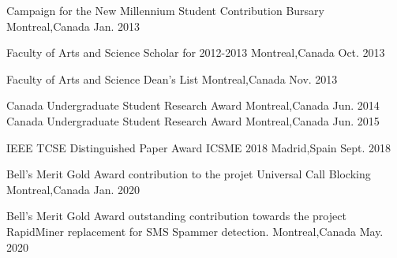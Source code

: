 \documentclass[11pt, a4paper]{awesome-cv} %
\begin{document}


\begin{cvhonors}	%
	
	\cvhonor
	{Campaign for the New Millennium Student Contribution Bursary} %
	{} %
	{Montreal,Canada} %
	{Jan. 2013} %
		
	\cvhonor
	{Faculty of Arts and Science Scholar for 2012-2013} %
	{} %
	{Montreal,Canada} %
	{Oct. 2013} %
		
	
	\cvhonor
	{Faculty of Arts and Science Dean’s List} %
	{} %
	{Montreal,Canada} %
	{Nov. 2013} %
	
	
	\cvhonor
	{Canada Undergraduate Student Research Award} %
	{} %
	{Montreal,Canada} %
	{Jun. 2014} %
	\cvhonor
	{Canada Undergraduate Student Research Award} %
	{} %
	{Montreal,Canada} %
	{Jun. 2015} %
		
			\cvhonor
		{IEEE TCSE Distinguished Paper Award} %
		{ICSME 2018} %
		{Madrid,Spain} %
		{Sept. 2018} %
		
		
					\cvhonor
		{Bell's Merit Gold Award} %
		{contribution to the projet Universal Call Blocking} %
		{Montreal,Canada} %
		{Jan. 2020} %
		
				
		\cvhonor
		{Bell's Merit Gold Award} %
		{outstanding contribution towards the project RapidMiner replacement for SMS Spammer detection.} %
		{Montreal,Canada} %
		{May. 2020} %
	
\end{cvhonors}
\end{document}

